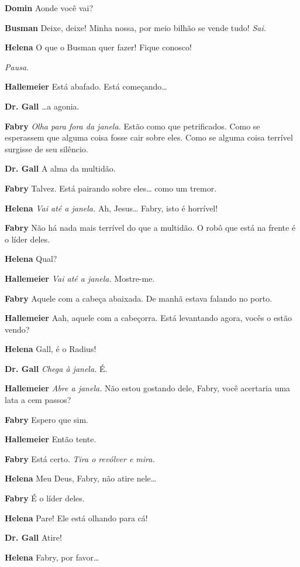 \textbf{Domin} Aonde você vai?

\textbf{Busman} Deixe, deixe! Minha nossa, por meio bilhão se vende tudo! \emph{Sai.}

\textbf{Helena} O que o Busman quer fazer! Fique conosco!

\emph{Pausa.}

\textbf{Hallemeier} Está abafado. Está começando\ldots{}

\textbf{Dr. Gall} \ldots{}a agonia.

\textbf{Fabry} \emph{Olha para fora da janela.} Estão como que petrificados. Como se
esperassem que alguma coisa fosse cair sobre eles. Como se alguma coisa terrível
surgisse de seu silêncio.

\textbf{Dr. Gall} A alma da multidão.

\textbf{Fabry} Talvez. Está pairando sobre eles\ldots{} como um \mbox{tremor}.

\textbf{Helena} \emph{Vai até a janela.} Ah, Jesus\ldots{} Fabry, isto é horrível!

\textbf{Fabry} Não há nada mais terrível do que a multidão. O robô que está na frente é
o líder deles.

\textbf{Helena} Qual?

\textbf{Hallemeier} \emph{Vai até a janela.} Mostre-me.

\textbf{Fabry} Aquele com a cabeça abaixada. De manhã estava falando no porto.

\textbf{Hallemeier} Aah, aquele com a cabeçorra. Está levantando agora, vocês o estão
vendo?

\textbf{Helena} Gall, é o Radius!

\textbf{Dr. Gall} \emph{Chega à janela.} É.

\textbf{Hallemeier} \emph{Abre a janela.} Não estou gostando dele, Fabry, você
acertaria uma lata a cem passos?

\textbf{Fabry} Espero que sim.

\textbf{Hallemeier} Então tente.

\textbf{Fabry} Está certo. \emph{Tira o revólver e mira.}

\textbf{Helena} Meu Deus, Fabry, não atire nele\ldots{}

\textbf{Fabry} É o líder deles.

\textbf{Helena} Pare! Ele está olhando para cá!

\textbf{Dr. Gall} Atire!

\textbf{Helena} Fabry, por favor\ldots{}

